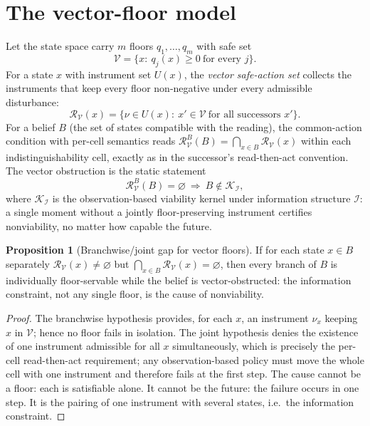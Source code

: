 \documentclass[10pt,twocolumn]{article}
\theoremstyle{definition}
\newtheorem{proposition}{Proposition}
\begin{document}
\section{The vector-floor model}

Let the state space carry $m$ floors $q_1,\dots,q_m$ with safe set
\begin{equation*}
\mathcal V=\{x:\ q_j(x)\ge 0\ \text{for every } j\}.
\end{equation*}
For a state $x$ with instrument set $U(x)$, the \emph{vector safe-action
set} collects the instruments that keep every floor non-negative under every
admissible disturbance:
\begin{equation*}
\mathcal R_{\mathcal V}(x)=\{\nu\in U(x):\ x'\in\mathcal V\
\text{for all successors } x'\}.
\end{equation*}
For a belief $B$ (the set of states compatible with the reading), the
common-action condition with per-cell semantics reads
$\mathcal R^B_{\mathcal V}(B)=\bigcap_{x\in B}\mathcal R_{\mathcal V}(x)$
within each indistinguishability cell, exactly as in the successor's
read-then-act convention. The vector obstruction is the static statement
\begin{equation*}
\mathcal R^B_{\mathcal V}(B)=\varnothing\ \Longrightarrow\
B\notin\mathcal K_{\mathcal I},
\end{equation*}
where $\mathcal K_{\mathcal I}$ is the observation-based viability kernel
under information structure $\mathcal I$: a single moment without a jointly
floor-preserving instrument certifies nonviability, no matter how capable
the future.

\begin{proposition}[Branchwise/joint gap for vector floors]
\label{prop:gap}
If for each state $x\in B$ separately $\mathcal R_{\mathcal V}(x)\neq
\varnothing$ but $\bigcap_{x\in B}\mathcal R_{\mathcal V}(x)=\varnothing$,
then every branch of $B$ is individually floor-servable while the belief is
vector-obstructed: the information constraint, not any single floor, is the
cause of nonviability.
\end{proposition}
\begin{proof}
The branchwise hypothesis provides, for each $x$, an instrument $\nu_x$
keeping $x$ in $\mathcal V$; hence no floor fails in isolation. The joint
hypothesis denies the existence of one instrument admissible for all $x$
simultaneously, which is precisely the per-cell read-then-act requirement;
any observation-based policy must move the whole cell with one instrument
and therefore fails at the first step. The cause cannot be a floor: each is
satisfiable alone. It cannot be the future: the failure occurs in one step.
It is the pairing of one instrument with several states, i.e.\ the
information constraint.
\end{proof}
\end{document}
